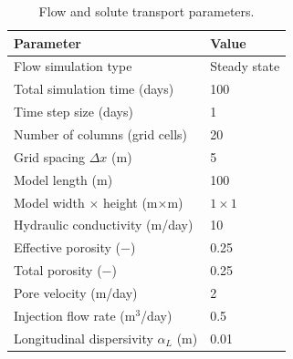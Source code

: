 \begin{table}[ht]
\centering
\caption{Flow and solute transport parameters.}
\label{tab:params}
\begin{tabular}{@{}L{8.5cm}l@{}}
\toprule
\textbf{Parameter} & \textbf{Value} \\
\midrule
Flow simulation type              & Steady state \\
Total simulation time (days)      & 100          \\
Time step size (days)             & 1            \\
Number of columns (grid cells)    & 20           \\
Grid spacing $\Delta x$ (m)       & 5            \\
Model length (m)                  & 100          \\
Model width $\times$ height (m$\times$m) & $1 \times 1$ \\
Hydraulic conductivity (m/day)    & 10           \\
Effective porosity ($-$)          & 0.25         \\
Total porosity ($-$)              & 0.25         \\
Pore velocity (m/day)             & 2            \\
Injection flow rate (m$^3$/day)   & 0.5          \\
Longitudinal dispersivity $\alpha_L$ (m) & 0.01  \\
\bottomrule
\end{tabular}
\end{table}

